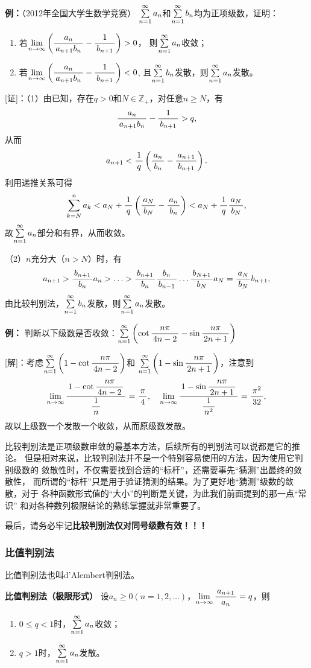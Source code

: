 {\bf 例：}（2012年全国大学生数学竞赛）
$\sumn a_n$和$\sumn b_n$均为正项级数，证明：
\begin{enumerate}[(1)]
  \setlength{\itemindent}{1cm}
  \item 若$\limn\left(\df{a_n}{a_{n+1}b_n}-\df 1{b_{n+1}}\right)>0$，
  则$\sumn a_n$收敛；
  \item 若$\limn\left(\df{a_n}{a_{n+1}b_n}-\df 1{b_{n+1}}\right)<0$,
  且$\sumn b_n$发散，则$\sumn a_n$发散。
\end{enumerate}

[证]：（1）由已知，存在$q>0$和$N\in\mathbb{Z}_+$，对任意$n\geq N$，有
$$\df{a_n}{a_{n+1}b_n}-\df 1{b_{n+1}}>q,$$
从而
$$a_{n+1}<\df1q\left(\df{a_n}{b_n}-\df{a_{n+1}}{b_{n+1}}\right).$$
利用递推关系可得
$$\sum\limits_{k=N}^na_k<a_N+\df1q\left(\df{a_N}{b_N}-\df{a_n}{b_n}\right)
<a_N+\df1q\df{a_N}{b_N},$$
故$\sumn a_n$部分和有界，从而收敛。

（2）$n$充分大（$n>N$）时，有
$$a_{n+1}>\df{b_{n+1}}{b_n}a_n>\ldots>
\df{b_{n+1}}{b_n}\df{b_{n}}{b_{n-1}}\ldots\df{b_{N+1}}{b_N}a_N
=\df{a_N}{b_N}b_{n+1},$$
由比较判别法，$\sumn b_n$发散，则$\sumn a_n$发散。\fin

{\bf 例：} 判断以下级数是否收敛：$\sumn\left(\cot\df{n\pi}{4n-2}-\sin\df{n\pi}{2n+1}\right)$

[解]：考虑$\sumn\left(1-\cot\df{n\pi}{4n-2}\right)$和
$\sumn\left(1-\sin\df{n\pi}{2n+1}\right)$，注意到
$$\limn\df{1-\cot\df{n\pi}{4n-2}}{\df1n}=\df{\pi}4,
\quad\limn\df{1-\sin\df{n\pi}{2n+1}}{\df1{n^2}}=\df{\pi^2}{32},$$
故以上级数一个发散一个收敛，从而原级数发散。\fin

比较判别法是正项级数审敛的最基本方法，后续所有的判别法可以说都是它的推论。
但是相对来说，比较判别法并不是一个特别容易使用的方法，因为使用它判别级数的
敛散性时，不仅需要找到合适的“标杆”，还需要事先“猜测”出最终的敛散性，
而所谓的“标杆”只是用于验证猜测的结果。为了更好地“猜测”级数的敛散，对于
各种函数形式值的“大小”的判断是关键，为此我们前面提到的那一点“常识”
和对各种数列极限结论的熟练掌握就非常重要了。

最后，请务必牢记{\bf\color{red}比较判别法仅对同号级数有效！！！}

\subsubsection{比值判别法}

比值判别法也叫{\kaishu d'Alembert判别法}。

\begin{thx}
	{\bf 比值判别法（极限形式）}
	设$a_n\geq 0(n=1,2,\ldots)$，$\limn\df{a_{n+1}}{a_n}=q$，则
	\begin{enumerate}
	  \item $0\leq q<1$时，$\sumn a_n$收敛； 
	  \item $q>1$时，$\sumn a_n$发散。
	\end{enumerate}
\end{thx}

